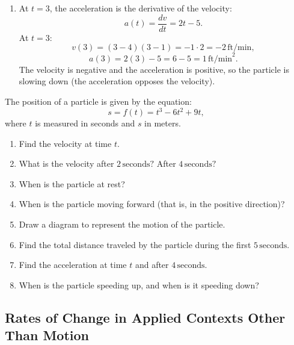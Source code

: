 \documentclass[12pt]{article}
\theoremstyle{beautifulthm}
\begin{document}
\begin{tcolorbox}[colback=examplebg, colframe=red!75!black, title=\textbf{EXAMPLE 1:  Position of a particle}, fonttitle=\bfseries, sharp corners]
\begin{enumerate}
    \item[(c)] At \( t = 3 \), the acceleration is the derivative of the velocity:
    \[
    a(t) = \frac{dv}{dt} = 2t - 5.
    \]
    At \( t = 3 \):
    \[
    v(3) = (3 - 4)(3 - 1) = -1 \cdot 2 = -2 \, \text{ft/min},
    \]
    \[
    a(3) = 2(3) - 5 = 6 - 5 = 1 \, \text{ft/min}^2.
    \]
    The velocity is negative and the acceleration is positive, so the particle is slowing down (the acceleration opposes the velocity).
\end{enumerate}




\end{tcolorbox}




\begin{tcolorbox}[colback=examplebg, colframe=red!75!black, title=\textbf{EXAMPLE 2:  Position of a particle}, fonttitle=\bfseries, sharp corners]
The position of a particle is given by the equation:
\[
s = f(t) = t^3 - 6t^2 + 9t,
\]
where \( t \) is measured in seconds and \( s \) in meters.
\begin{enumerate}
    \item[(a)] Find the velocity at time \( t \).
    \item[(b)] What is the velocity after \( 2 \, \text{seconds}? \) After \( 4 \, \text{seconds}? \)
    \item[(c)] When is the particle at rest?
    \item[(d)] When is the particle moving forward (that is, in the positive direction)?
    \item[(e)] Draw a diagram to represent the motion of the particle.
    \item[(f)] Find the total distance traveled by the particle during the first \( 5 \, \text{seconds.} \)
    \item[(g)] Find the acceleration at time \( t \) and after \( 4 \, \text{seconds.} \)
    \item[(h)] When is the particle speeding up, and when is it speeding down?
\end{enumerate}




\end{tcolorbox}




\newpage
\subsection{Rates of Change in Applied Contexts Other Than Motion}
\end{document}
